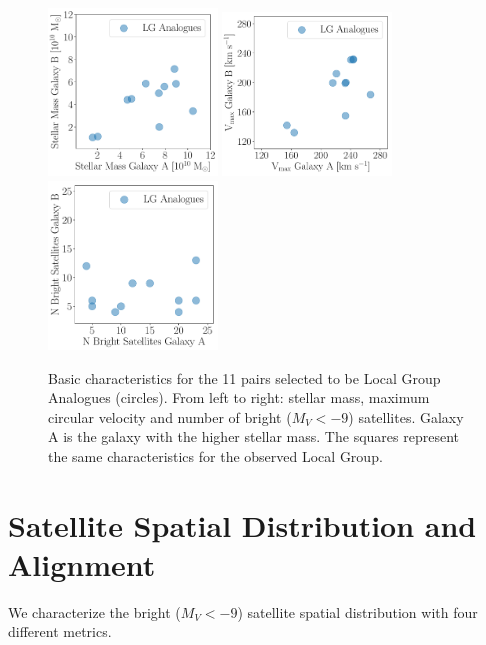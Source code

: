 \documentclass[a4paper,fleqn,usenatbib]{mnras}
\begin{document}
\begin{figure}
\centering
\includegraphics[width=0.40\textwidth]{mstar.pdf}
\includegraphics[width=0.40\textwidth]{vmax.pdf}
\includegraphics[width=0.40\textwidth]{nsat.pdf}
\caption{Basic characteristics for the 11 pairs selected to be Local
  Group Analogues (circles). From left to right: stellar mass, maximum circular
  velocity and number of bright ($M_V<-9$) satellites.
  Galaxy A is the galaxy with the higher stellar mass.
  The squares represent the same characteristics for the observed
  Local Group. 
\label{fig:general}}
\end{figure}




\section{Satellite Spatial Distribution and Alignment}
\label{sec:SpatialMeasurements}

We characterize the bright ($M_V<-9$) satellite spatial distribution
with four different metrics. 
\end{document}
